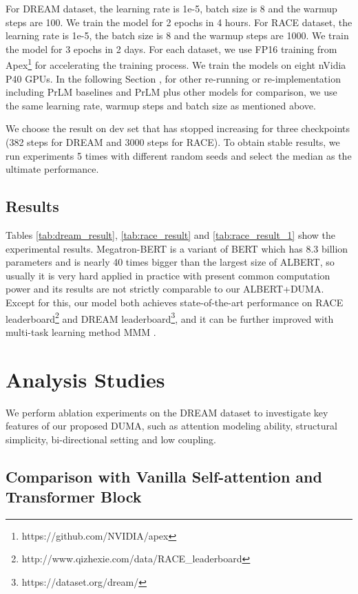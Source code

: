 \documentclass[letterpaper]{article} \usepackage{aaai21}  \usepackage{times}  \usepackage{helvet} \usepackage{courier}  \usepackage[hyphens]{url}  \usepackage{graphicx} \urlstyle{rm} \def\UrlFont{\rm}  \usepackage{natbib}  \usepackage{caption} \frenchspacing  \setlength{\pdfpagewidth}{8.5in}  \setlength{\pdfpageheight}{11in}
\begin{document}
For DREAM dataset, the learning rate is 1e-5, batch size is 8 and the warmup steps are 100. We train the model for 2 epochs in 4 hours. For RACE dataset, the learning rate is 1e-5, the batch size is 8 and the warmup steps are 1000. We train the model for 3 epochs in 2 days. For each dataset, we use FP16 training from Apex\footnote{https://github.com/NVIDIA/apex} for accelerating the training process. We train the models on eight nVidia P40 GPUs. In the following Section \textit{}, for other re-running or re-implementation including PrLM baselines and PrLM plus other models for comparison, we use the same learning rate, warmup steps and batch size as mentioned above. 

We choose the result on dev set that has stopped increasing for three checkpoints (382 steps for DREAM and 3000 steps for RACE). To obtain stable results, we run experiments 5 times with different random seeds and select the median as the ultimate performance.

\subsection{Results}
Tables \ref{tab:dream_result}, \ref{tab:race_result} and \ref{tab:race_result_1} show the experimental results. Megatron-BERT \cite{Megatron} is a variant of BERT \cite{bert} which has 8.3 billion parameters and is nearly 40 times bigger than the largest size of ALBERT, so usually it is very hard applied in practice with present common computation power and its results are not strictly comparable to our ALBERT+DUMA. Except for this, our model both achieves state-of-the-art performance on RACE leaderboard\footnote{http://www.qizhexie.com/data/RACE\_leaderboard} and DREAM leaderboard\footnote{https://dataset.org/dream/}, and it can be further improved with multi-task learning method MMM \cite{dumamulti, mmm}.

\section{Analysis Studies}\label{ablation_sec}

We perform ablation experiments on the DREAM dataset to investigate key features of our proposed DUMA, such as attention modeling ability, structural simplicity, bi-directional setting and low coupling.

\subsection{Comparison with Vanilla Self-attention and Transformer Block}\label{trm_block}
\end{document}
